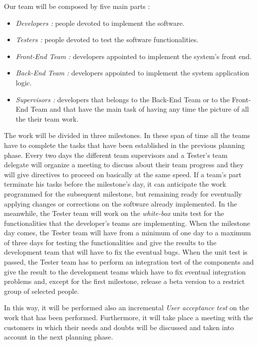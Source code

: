 \newpage
{}
Our team will be composed by five main parts :
\begin{itemize}
	\item \emph{Developers :} people devoted to implement the software.
	
	\item \emph{Testers :} people devoted to test the software functionalities.
	
	\item \emph{Front-End Team :} developers appointed to implement the system’s front end.
	
	
	\item \emph{Back-End Team :} developers appointed to implement the system application logic.
	
	\item \emph{Supervisors :} developers that belongs to the Back-End Team or to the Front-End Team and that have the main task of having any time the picture of all the their team work.
\end{itemize}

The work will be divided in three milestones. In these span of time all the teams have to complete the tasks that have been established in the previous planning phase. Every two days the different team supervisors and a Tester’s team delegate will organize a meeting to discuss about their team progress and they will give directives to proceed on basically at the same speed. If a team’s part terminate his tasks before the milestone’s day, it can anticipate the work programmed for the subsequent milestone, but remaining ready for eventually applying changes or corrections on the software already implemented.
In the meanwhile, the Tester team will work on the \emph{white-box} units test for the functionalities that the developer’s teams are implementing.
When the milestone day comes, the Tester team will have from a minimum of one day to a maximum of three days for testing the functionalities and give the results to the development team that will have to fix the eventual bugs.
When the unit test is passed, the Tester team has to perform an integration test of the components and give the result to the development teams which have to fix eventual integration problems and, except for the first milestone, release a beta version to a restrict group of selected people.

In this way, it will be performed also an incremental \emph{User acceptance test} on the work that has been performed. Furthermore, it will take place a meeting with the customers in which their needs and doubts will be discussed and taken into account in the next planning phase.

